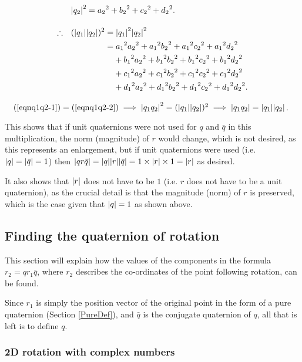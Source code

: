\documentclass[10pt]{article}
\begin{document}
\begin{alignat}{2}
    & \abs{q_2}^2 = {a_2}^2 + {b_2}^2 + {c_2}^2 + {d_2}^2. \nonumber \\[10pt]
    \therefore \quad & (\abs{q_1}\abs{q_2})^2 = \abs{q_1}^2\abs{q_2}^2 \nonumber \\
             & \phantom{(\abs{q_1}\abs{q_2})^2} = {a_1}^2{a_2}^2 + {a_1}^2{b_2}^2 + {a_1}^2{c_2}^2 + {a_1}^2{d_2}^2 \label{eqnq1q2-2} \\
             & \phantom{(\abs{q_1}\abs{q_2})^2=} + {b_1}^2{a_2}^2 + {b_1}^2{b_2}^2 + {b_1}^2{c_2}^2 + {b_1}^2{d_2}^2 \nonumber \\
             & \phantom{(\abs{q_1}\abs{q_2})^2=} + {c_1}^2{a_2}^2 + {c_1}^2{b_2}^2 + {c_1}^2{c_2}^2 + {c_1}^2{d_2}^2 \nonumber \\
             & \phantom{(\abs{q_1}\abs{q_2})^2=} + {d_1}^2{a_2}^2 + {d_1}^2{b_2}^2 + {d_1}^2{c_2}^2 + {d_1}^2{d_2}^2. \nonumber
\end{alignat}
\endgroup

$\quad (\ref{eqnq1q2-1}) = (\ref{eqnq1q2-2}) \implies \abs{q_1q_2}^2 = (\abs{q_1}\abs{q_2})^2 \implies \abs{q_1q_2} = \abs{q_1}\abs{q_2}$.

This shows that if unit quaternions were not used for $q$ and $\bar{q}$ in this multiplication, the norm (magnitude) of $r$ would change, which is not desired, as this represents an enlargement, but if unit quaternions were used (i.e. $\abs{q} = \abs{\bar{q}} = 1$) then $\abs{qr\bar{q}} = \abs{q}\abs{r}\abs{\bar{q}} = 1\times\abs{r}\times1 = \abs{r}$ as desired.

It also shows that $\abs{r}$ does not have to be $1$ (i.e. $r$ does not have to be a unit quaternion), as the crucial detail is that the magnitude (norm) of $r$ is preserved, which is the case given that $\abs{q} = 1$ as shown above.

\subsection{Finding the quaternion of rotation}

This section will explain how the values of the components in the formula $r_2 = qr_1\bar{q}$, where $r_2$ describes the co-ordinates of the point following rotation, can be found.

Since $r_1$ is simply the position vector of the original point in the form of a pure quaternion (Section \ref{PureDef}), and $\bar{q}$ is the conjugate quaternion of $q$, all that is left is to define $q$.

\subsubsection{2D rotation with complex numbers}
\end{document}
